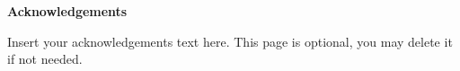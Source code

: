 
\clearpage
\begin{center}

\vspace*{5\baselineskip}
\textbf{\large Acknowledgements}
\end{center}


\begin{flushleft}
\hspace{10mm}Insert your acknowledgements text here. This page is optional, you may delete it if not needed. 
\end{flushleft}
\clearpage



